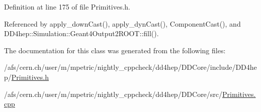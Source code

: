 Definition at line 175 of file Primitives.\+h.



Referenced by apply\+\_\+down\+Cast(), apply\+\_\+dyn\+Cast(), Component\+Cast(), and D\+D4hep\+::\+Simulation\+::\+Geant4\+Output2\+R\+O\+O\+T\+::fill().



The documentation for this class was generated from the following files\+:\begin{DoxyCompactItemize}
\item 
/afs/cern.\+ch/user/m/mpetric/nightly\+\_\+cppcheck/dd4hep/\+D\+D\+Core/include/\+D\+D4hep/\hyperlink{_primitives_8h}{Primitives.\+h}\item 
/afs/cern.\+ch/user/m/mpetric/nightly\+\_\+cppcheck/dd4hep/\+D\+D\+Core/src/\hyperlink{_primitives_8cpp}{Primitives.\+cpp}\end{DoxyCompactItemize}
